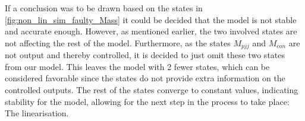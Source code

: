 \newpage

If a conclusion was to be drawn based on the states in \cref{fig:non_lin_sim_faulty_Mass} it could be decided that the model is not stable and accurate enough. However, as mentioned earlier, the two involved states are not affecting the rest of the model. Furthermore, as the states $ M_{pjj} $ and $ M_{con} $ are not output and thereby controlled, it is decided to just omit these two states from our model. This leaves the model with 2 fewer states, which can be considered favorable since the states do not provide extra information on the controlled outputs. The rest of the states converge to constant values, indicating stability for the model, allowing for the next step in the process to take place: The linearisation.





